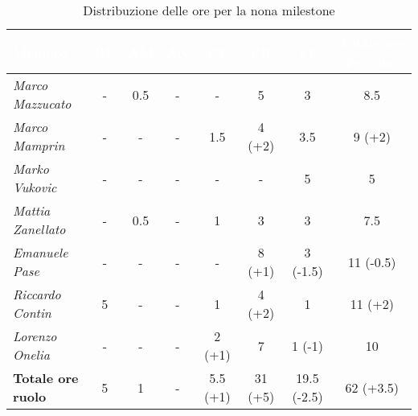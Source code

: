 \begin{table}[H]
    \renewcommand\arraystretch{1.5}
    \small
    \centering
        \begin{tabular}{|l|c|c|c|c|c|c|c|}
            \hline
            \rowcolor[HTML]{036400}
            \textcolor{white}{\textbf{Membro}} & \multicolumn{1}{c|}{\textcolor{white}{\textbf{RE}}} & \multicolumn{1}{c|}{\textcolor{white}{\textbf{AM}}} & \multicolumn{1}{c|}{\textcolor{white}{\textbf{AN}}} & \multicolumn{1}{c|}{\textcolor{white}{\textbf{PT}}} & \multicolumn{1}{c|}{\textcolor{white}{\textbf{PR}}} & \multicolumn{1}{c|}{\textcolor{white}{\textbf{VE}}} & \multicolumn{1}{c|}{\textcolor{white}{\textbf{Totale ore persona}}} \\ \hline
            \rowcolor[HTML]{EFEFEF}\textit{Marco Mazzucato}  & -         & 0.5        & -          & -        & 5       & 3           & 8.5    \\ \hline
            \rowcolor[HTML]{C0C0C0}\textit{Marco Mamprin}    & -         & -          & -          & 1.5      & 4 (+2)  & 3.5         & 9 (+2)          \\ \hline
            \rowcolor[HTML]{EFEFEF}\textit{Marko Vukovic}    & -         & -          & -          & -        & -       & 5           & 5           \\ \hline
            \rowcolor[HTML]{C0C0C0}\textit{Mattia Zanellato} & -         & 0.5        & -          & 1        & 3       & 3           & 7.5      \\ \hline
            \rowcolor[HTML]{EFEFEF}\textit{Emanuele Pase}    & -         & -          & -          & -        & 8 (+1)  & 3 (-1.5)    & 11 (-0.5)      \\ \hline
            \rowcolor[HTML]{C0C0C0}\textit{Riccardo Contin}  & 5         & -          & -          & 1        & 4 (+2)  & 1           & 11 (+2)          \\ \hline
            \rowcolor[HTML]{EFEFEF}\textit{Lorenzo Onelia}   & -         & -          & -          & 2 (+1)   & 7       & 1 (-1)      & 10        \\ \hline
            \rowcolor[HTML]{C0C0C0}\textbf{Totale ore ruolo} & 5         & 1          & -          & 5.5 (+1) & 31 (+5) & 19.5 (-2.5) & 62 (+3.5)  \\ \hline
        \end{tabular}
    \caption{Distribuzione delle ore per la nona milestone}
\end{table}

